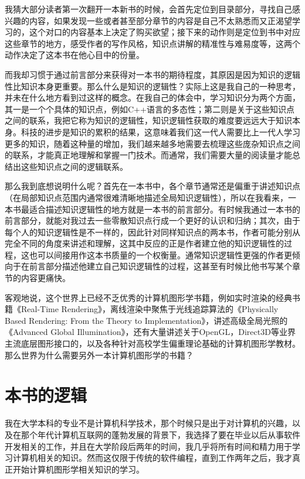 \preface
{}
\mtcaddchapter 

我猜大部分读者第一次翻开一本新书的时候，会首先定位到目录部分，寻找自己感兴趣的内容，如果发现一些或者甚至部分章节的内容是自己不太熟悉而又正渴望学习的，这个对口的内容基本上决定了购买欲望；接下来的动作则是定位到书中对应这些章节的地方，感受作者的写作风格，知识点讲解的精准性与难易度等，这两个动作决定了这本书在他心目中的份量。

而我却习惯于通过前言部分来获得对一本书的期待程度，其原因是因为知识的逻辑性比知识本身更重要。那么什么是知识的逻辑性？实际上这是我自己的一种思考，并未在什么地方看到过这样的概念。在我自己的体会中，学习知识分为两个方面，其一是一个个具体的知识点，例如C++语言的多态性；第二则是关于这些知识点之间的联系，我把它称为知识的逻辑性，知识逻辑性获取的难度要远远大于知识本身。科技的进步是知识的累积的结果，这意味着我们这一代人需要比上一代人学习更多的知识，随着这种量的增加，我们越来越多地需要去梳理这些庞杂知识点之间的联系，才能真正地理解和掌握一门技术。而通常，我们需要大量的阅读量才能总结出这些知识点之间的逻辑联系。

那么我到底想说明什么呢？首先在一本书中，各个章节通常还是偏重于讲述知识点（在局部知识点范围内通常很难清晰地描述全局知识逻辑性），所以在我看来，一本书最适合描述知识逻辑性的地方就是一本书的前言部分。有时候我通过一本书的前言部分，就能对我过去一些零散知识点行成一个更好的认识和归纳；其次，由于每个人的知识逻辑性是不一样的，因此针对同样知识点的两本书，作者可能分别从完全不同的角度来讲述和理解，这其中反应的正是作者建立他的知识逻辑性的过程，这也可以间接用作这本书质量的一个权衡量。通常知识逻辑性更强的作者更倾向于在前言部分描述他建立自己知识逻辑性的过程，这甚至有时候比他书写某个章节的内容更痛快。

客观地说，这个世界上已经不乏优秀的计算机图形学书籍，例如实时渲染的经典书籍《Real-Time Rendering》\cite{b:rtr}，离线渲染中聚焦于光线追踪算法的《Physically Based Rendering: From the Theory to Implementation》\cite{b:pbrt}，讲述高级全局光照的《Advanced Global Illumination》\cite{b:AdvancedGlobalIllumination}，还有大量讲述关于OpenGL，Direct3D等业界主流底层图形接口的，以及各种针对高校学生偏重理论基础的计算机图形学教材。那么世界为什么需要另外一本计算机图形学的书籍？



\section*{本书的逻辑}
我在大学本科的专业不是计算机科学技术，那个时候只是出于对计算机的兴趣，以及在那个年代计算机互联网的蓬勃发展的背景下，我选择了要在毕业以后从事软件开发相关的工作，并且在大学阶段后两年的时间，我几乎将所有时间和精力用于学习计算机相关的知识。然而这仅限于传统的软件编程，直到工作两年之后，我才真正开始计算机图形学相关知识的学习。

